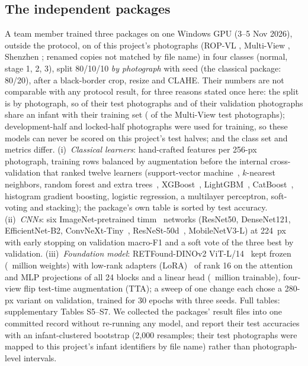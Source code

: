 \documentclass[journal]{IEEEtran}
\begin{document}
\subsection{The independent packages}\label{sec:mate}
A team member trained three packages on one Windows GPU (3--5 Nov 2026), outside the protocol, on \mateN{} of this project's photographs (ROP-VL \mateSrcRopvl{}, Multi-View \mateSrcMultiview{}, Shenzhen \mateSrcShenzhen{}; \mateUnmatched{} renamed copies not matched by file name) in four classes (normal, stage 1, 2, 3), split 80/10/10 \emph{by photograph} with seed \seedA{} (the classical package: 80/20), after a black-border crop, resize and CLAHE. Their numbers are not comparable with any protocol result, for three reasons stated once here: the split is by photograph, so \mateLeakTest{} of their test photographs and \mateLeakVal{} of their validation photographs share an infant with their training set (\mateLeakMV{} of the Multi-View test photographs); \mateDevTrain{} development-half and \mateLockedTrain{} locked-half photographs were used for training, so these models can never be scored on this project's test halves; and the class set and metrics differ. (i)~\emph{Classical learners}: \mateMLFeat{} hand-crafted features per 256-px photograph, training rows balanced by augmentation before the internal cross-validation that ranked twelve learners (support-vector machine~\cite{cortes1995}, $k$-nearest neighbors, random forest and extra trees~\cite{breiman2001}, XGBoost~\cite{chen2016}, LightGBM~\cite{ke2017}, CatBoost~\cite{prokhorenkova2018}, histogram gradient boosting, logistic regression, a multilayer perceptron, soft-voting and stacking); the package's own table is sorted by test accuracy. (ii)~\emph{CNNs}: six ImageNet-pretrained timm~\cite{wightman2019} networks (ResNet50, DenseNet121, EfficientNet-B2, ConvNeXt-Tiny~\cite{liu2022}, ResNeSt-50d~\cite{zhang2022}, MobileNetV3-L) at 224~px with early stopping on validation macro-F1 and a soft vote of the three best by validation. (iii)~\emph{Foundation model}: RETFound-DINOv2 ViT-L/14~\cite{zhou2023} kept frozen (\mateFMtotal{}~million weights) with low-rank adapters (LoRA)~\cite{hu2022} of rank 16 on the attention and MLP projections of all 24 blocks and a linear head (\mateFMtrainable{}~million trainable), four-view flip test-time augmentation (TTA); a sweep of one change each chose a 280-px variant on validation, trained for 30 epochs with three seeds. Full tables: supplementary Tables S5--S7. We collected the packages' result files into one committed record without re-running any model, and report their test accuracies with an infant-clustered bootstrap (2{,}000 resamples; their test photographs were mapped to this project's infant identifiers by file name) rather than photograph-level intervals.
\end{document}
